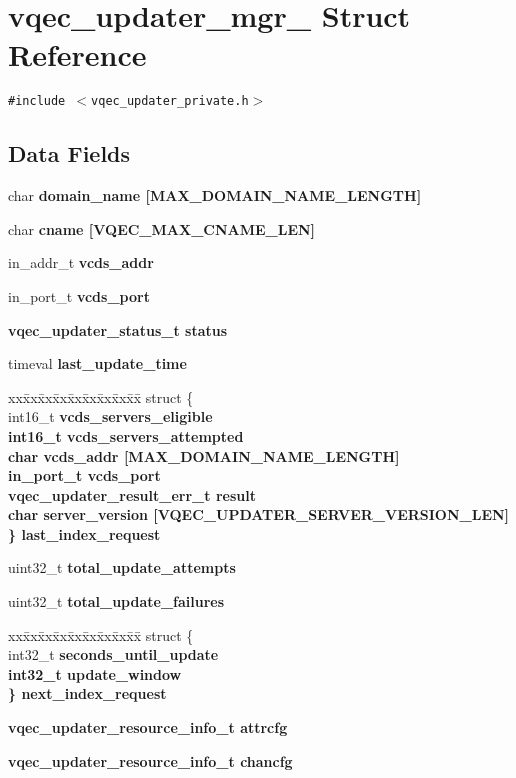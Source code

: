 \section{vqec\_\-updater\_\-mgr\_\- Struct Reference}
\label{structvqec__updater__mgr__}
{\tt \#include $<$vqec\_\-updater\_\-private.h$>$}

\subsection*{Data Fields}
\begin{CompactItemize}
\item 
char \bf{domain\_\-name} [MAX\_\-DOMAIN\_\-NAME\_\-LENGTH]
\item 
char \bf{cname} [VQEC\_\-MAX\_\-CNAME\_\-LEN]
\item 
in\_\-addr\_\-t \bf{vcds\_\-addr}
\item 
in\_\-port\_\-t \bf{vcds\_\-port}
\item 
\bf{vqec\_\-updater\_\-status\_\-t} \bf{status}
\item 
timeval \bf{last\_\-update\_\-time}
\item 
\begin{tabbing}
xx\=xx\=xx\=xx\=xx\=xx\=xx\=xx\=xx\=\kill
struct \{\\
\>int16\_t \bf{vcds\_servers\_eligible}\\
\>int16\_t \bf{vcds\_servers\_attempted}\\
\>char \bf{vcds\_addr} [MAX\_DOMAIN\_NAME\_LENGTH]\\
\>in\_port\_t \bf{vcds\_port}\\
\>\bf{vqec\_updater\_result\_err\_t} \bf{result}\\
\>char \bf{server\_version} [VQEC\_UPDATER\_SERVER\_VERSION\_LEN]\\
\} \bf{last\_index\_request}\\

\end{tabbing}\item 
uint32\_\-t \bf{total\_\-update\_\-attempts}
\item 
uint32\_\-t \bf{total\_\-update\_\-failures}
\item 
\begin{tabbing}
xx\=xx\=xx\=xx\=xx\=xx\=xx\=xx\=xx\=\kill
struct \{\\
\>int32\_t \bf{seconds\_until\_update}\\
\>int32\_t \bf{update\_window}\\
\} \bf{next\_index\_request}\\

\end{tabbing}\item 
\bf{vqec\_\-updater\_\-resource\_\-info\_\-t} \bf{attrcfg}
\item 
\bf{vqec\_\-updater\_\-resource\_\-info\_\-t} \bf{chancfg}
\end{CompactItemize}


